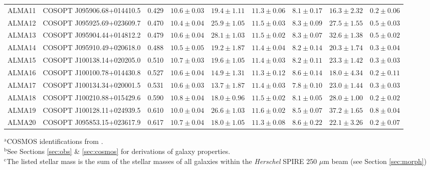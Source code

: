 \documentclass[a4paper,fleqn,usenatbib]{mnras}
\begin{document}
\begin{table*}
\begin{tabular}{ccccccccc}
ALMA11 & COSOPT J095906.68+014410.5 & 0.429 & $10.6 \pm 0.03$ & $19.4 \pm 1.11$ & $11.3 \pm 0.06$ & $ 8.1 \pm 0.17$ & $16.3 \pm 2.32$ & $ 0.2 \pm 0.06$\\ 
ALMA12 & COSOPT J095925.69+023609.7 & 0.470 & $10.4 \pm 0.04$ & $25.9 \pm 1.05$ & $11.5 \pm 0.03$ & $ 8.3 \pm 0.09$ & $27.5 \pm 1.55$ & $ 0.5 \pm 0.03$\\ 
ALMA13 & COSOPT J095904.44+014812.2 & 0.479 & $10.6 \pm 0.04$ & $28.1 \pm 1.03$ & $11.5 \pm 0.02$ & $ 8.3 \pm 0.07$ & $32.6 \pm 1.38$ & $ 0.5 \pm 0.02$\\ 
ALMA14 & COSOPT J095910.49+020618.0 & 0.488 & $10.5 \pm 0.05$ & $19.2 \pm 1.87$ & $11.4 \pm 0.04$ & $ 8.2 \pm 0.14$ & $20.3 \pm 1.74$ & $ 0.3 \pm 0.04$\\ 
ALMA15 & COSOPT J100138.14+020205.0 & 0.510 & $10.7 \pm 0.03$ & $19.6 \pm 1.05$ & $11.4 \pm 0.03$ & $ 8.2 \pm 0.11$ & $23.3 \pm 1.42$ & $ 0.3 \pm 0.03$\\ 
ALMA16 & COSOPT J100100.78+014430.8 & 0.527 & $10.6 \pm 0.04$ & $14.9 \pm 1.31$ & $11.3 \pm 0.12$ & $ 8.6 \pm 0.14$ & $18.0 \pm 4.34$ & $ 0.2 \pm 0.11$\\ 
ALMA17 & COSOPT J100134.34+020001.5 & 0.531 & $10.6 \pm 0.03$ & $13.7 \pm 1.87$ & $11.4 \pm 0.03$ & $ 7.8 \pm 0.10$ & $23.0 \pm 1.44$ & $ 0.3 \pm 0.03$\\ 
ALMA18 & COSOPT J100210.88+015429.6 & 0.590 & $10.8 \pm 0.04$ & $18.0 \pm 0.96$ & $11.5 \pm 0.02$ & $ 8.1 \pm 0.05$ & $28.0 \pm 1.00$ & $ 0.2 \pm 0.02$\\ 
ALMA19 & COSOPT J100128.11+024939.5 & 0.610 & $10.0 \pm 0.04$ & $26.6 \pm 1.03$ & $11.6 \pm 0.02$ & $ 8.5 \pm 0.07$ & $37.2 \pm 1.65$ & $ 0.8 \pm 0.04$\\ 
ALMA20 & COSOPT J095853.15+023617.9 & 0.617 & $10.7 \pm 0.04$ & $18.0 \pm 1.05$ & $11.3 \pm 0.08$ & $ 8.6 \pm 0.22$ & $22.1 \pm 3.26$ & $ 0.2 \pm 0.07$\\ 
\hline
\end{tabular}
\begin{flushleft}
$^{\mathrm{a}}$COSMOS identifications from \citet{2013A&A...556A..55I}.\\
$^{\mathrm{b}}$See Sections \ref{sec:obs} \& \ref{sec:cosmos} for derivations of galaxy properties.\\
$^{\mathrm{c}}$The listed stellar mass is the sum of the stellar masses of all galaxies within the {\em Herschel} SPIRE 250 $\mu$m beam (see Section \ref{sec:morph})\\
\end{flushleft}
\end{table*}
\end{document}
